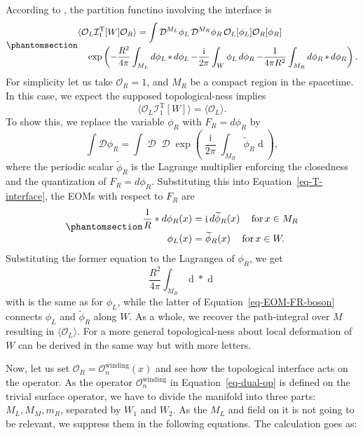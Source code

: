 \documentclass[
  letterpaper,
  DIV=11,
  numbers=noendperiod]{scrreport}
\DeclareMathOperator{\imunit}{i}
\begin{document}
According to \autocite{Kapustin:2009av}, the partition functino
involving the interface is
\begin{equation}\phantomsection\label{eq-T-interface}{
\begin{multlined}
\langle \mathcal{O}_L \mathcal{I}^\text{T}_1[W] \mathcal{O}_R  \rangle= 
\int \mathop{\mathcal{D}^{M_L}\phi_L}\mathop{\mathcal{D}^{M_R}\phi_R}
\mathcal{O}_L[\phi_L]\mathcal{O}_R[\phi_R]\\
\exp\left(-\frac{R^2}{4\pi}\int_{M_L}\mathop{d\phi_L}*\mathop{d\phi_L}
-\frac{\imunit}{2\pi}\int_W \phi_L\mathop{d\phi_R}
-\frac{1}{4\pi R^2}\int_{M_R}\mathop{d\phi_R}*\mathop{d\phi_R}\right).
\end{multlined}
}\end{equation} For simplicity let us take \(\mathcal{O}_R =1\), and
\(M_R\) be a compact region in the spacetime. In this case, we expect
the supposed topological-ness implies \[
\langle \mathcal{O}_L \mathcal{I}_1^\text{T}[W]\rangle = \langle \mathcal{O}_L \rangle.
\] To show this, we replace the variable \(\phi_R\) with
\(F_R = d\phi_R\) by \[
\int \mathcal{D}\phi_R = \int \mathop{\mathcal{D}F_R} \mathop{\mathcal{D}\widetilde{\phi}_R}
\exp\left(\frac{\imunit}{2\pi} \int_{M_R}\widetilde{\phi}_R \mathop{dF_R}\right),
\] where the periodic scalar \(\widetilde{\phi}_R\) is the Lagrange
multiplier enforcing the closedness and the quantization of
\(F_R = d\phi_R\). Substituting this into Equation~\ref{eq-T-interface},
the EOMs with respect to \(F_R\) are
\begin{equation}\phantomsection\label{eq-EOM-FR-boson}{
\begin{aligned}
    \frac{1}{R} *d\phi_R(x) &= \imunit d\widetilde\phi_R(x) \quad \mathop{\text{for}} x \in M_R \\
    \phi_L(x) &= \widetilde{\phi}_R(x) \quad \mathop{\text{for}} x \in W.
\end{aligned}
}\end{equation} Substituting the former equation to the Lagrangea of
\(\phi_R\), we get \[
    \frac{R^2}{4\pi} \int_{M_R}\mathop{d\widetilde{\phi}_R}*\mathop{d\widetilde{\phi}_R}
\] with is the same as for \(\phi_L\), while the latter of
Equation~\ref{eq-EOM-FR-boson} connects \(\phi_L\) and
\(\widetilde{\phi}_R\) along \(W\). As a whole, we recover the
path-integral over \(M\) resulting in \(\langle \mathcal{O}_L \rangle\).
For a more general topological-ness about local deformation of \(W\) can
be derived in the same way but with more letters.

Now, let us set \(\mathcal{O}_R = \mathcal{O}^\text{winding}_n(x)\) and
see how the topological interface acts on the operator. As the operator
\(\mathcal{O}^\text{winding}_n\) in Equation~\ref{eq-dual-op} is defined
on the trivial surface operator, we have to divide the manifold into
three parts: \(M_L,M_M,m_R\), separated by \(W_1\) and \(W_2\). As the
\(M_L\) and field on it is not going to be relevant, we suppress them in
the following equations. The calculation goes as:
\end{document}
